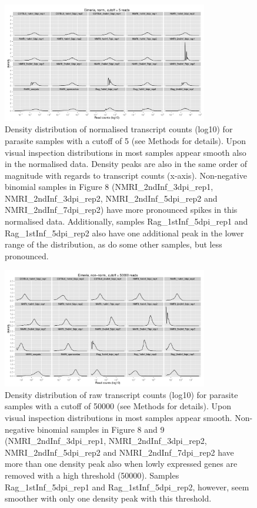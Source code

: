 \documentclass{article}
\begin{document}
\begin{figure}[h]
\begin{center}
\includegraphics[width=0.8\textwidth]{distributions_Efnorm5} %
\caption{Density distribution of normalised transcript counts (log10)
  for parasite samples with a cutoff of 5 (see Methods for
  details). Upon visual inspection distributions in most samples
  appear smooth also in the normalised data. Density peaks are also in
  the same order of magnitude with regards to transcript counts
  (x-axis). Non-negative binomial samples in Figure 8
  (NMRI\_2ndInf\_3dpi\_rep1, NMRI\_2ndInf\_3dpi\_rep2,
  NMRI\_2ndInf\_5dpi\_rep2 and NMRI\_2ndInf\_7dpi\_rep2) have more
  pronounced spikes in this normalised data. Additionally, samples
  Rag\_1stInf\_5dpi\_rep1 and Rag\_1stInf\_5dpi\_rep2 also have one
  additional peak in the lower range of the distribution, as do some
  other samples, but less pronounced.}
\end{center}
\end{figure}

\begin{figure}[h]
\begin{center}
\includegraphics[width=0.8\textwidth]{distributions_Ef50000} %
\caption{Density distribution of raw transcript counts (log10) for
  parasite samples with a cutoff of 50000 (see Methods for
  details). Upon visual inspection distributions in most samples
  appear smooth. Non-negative binomial samples in Figure 8 and 9
  (NMRI\_2ndInf\_3dpi\_rep1, NMRI\_2ndInf\_3dpi\_rep2,
  NMRI\_2ndInf\_5dpi\_rep2 and NMRI\_2ndInf\_7dpi\_rep2 have more than
  one density peak also when lowly expressed genes are removed with a
  high threshold (50000). Samples Rag\_1stInf\_5dpi\_rep1 and
  Rag\_1stInf\_5dpi\_rep2, however, seem smoother with only one
  density peak with this threshold.}
\end{center}
\end{figure}
\end{document}
